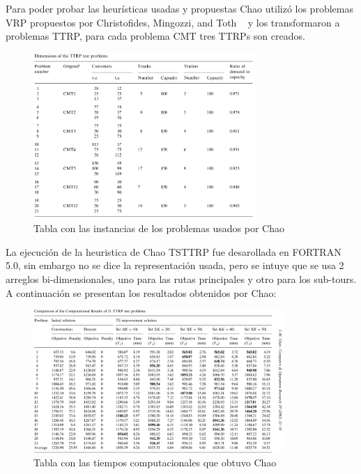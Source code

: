 \documentclass[letter, 10pt]{article}
\begin{document}
Para poder probar las heurísticas usadas y propuestas Chao utilizó los problemas VRP propuestos por Christofides, Mingozzi, and Toth ~\cite{CMT} y los transformaron a problemas TTRP, para cada problema CMT tres TTRPs son creados.

\begin{figure}[hp!]
\label{Tabla3}
\centering
\includegraphics[width=0.75\textwidth]{fig2.png}
\caption{Tabla con las instancias de los problemas usados por Chao ~\cite{Chao}} 
\end{figure}

La ejecución de la heuristica de Chao TSTTRP fue desarollada en FORTRAN 5.0, sin embargo no se dice la representación usada, pero se intuye que se usa 2 arreglos bi-dimensionales, uno para las rutas principales y otro para los sub-tours. A continuación se presentan los resultados obtenidos por Chao:

\begin{figure}[htbp!]
\label{Tabla1}
\centering
\includegraphics[width=0.85\textwidth]{fig3.png}
\caption{Tabla con las tiempos computacionales que obtuvo Chao ~\cite{Chao}} 
\end{figure}
\end{document}
